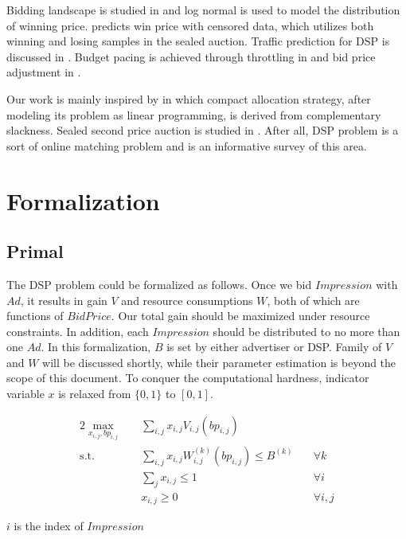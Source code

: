 \documentclass[sigconf]{acmart}
\newcommand{\sumj}{\sum\limits_j}
\newcommand{\sumij}{\sum\limits_{i,j}}
\newcommand{\sx}{x_{i,j}}
\newcommand{\sbp}{bp_{i,j}}
\newcommand{\sV}{V_{i,j}}
\newcommand{\sW}{W_{i,j}^{(k)}}
\newcommand{\sB}{B^{(k)}}
\newcommand{\dspresourceconstraint}{\sumij \sx \sW(\sbp) \le \sB}
\newcommand{\assignmentconstraint}{\sumj \sx \le 1}
\begin{document}
Bidding landscape is studied in \cite{YingCui2011} and log normal is used to model the distribution of winning price.
\cite{Wu2015} predicts win price with censored data, which utilizes both winning and losing samples in the sealed auction.
Traffic prediction for DSP is discussed in \cite{Traffic2016}.
Budget pacing is achieved through throttling in \cite{Throttle2015} and bid price adjustment in \cite{Pacing2013}.

Our work is mainly inspired by \cite{YeChen2011} in which compact allocation strategy,
    after modeling its problem as linear programming, is derived from complementary slackness.
Sealed second price auction is studied in \cite{SSPA1961}.
After all, DSP problem is a sort of online matching problem and \cite{Mehta} is an informative survey of this area.

\section{Formalization}

\subsection{Primal}

The DSP problem could be formalized as follows.
Once we bid $Impression$ with $Ad$, it results in gain $V$ and resource consumptions $W$, both of which are functions of $BidPrice$.
Our total gain should be maximized under resource constraints.
In addition, each $Impression$ should be distributed to no more than one $Ad$.
In this formalization, $B$ is set by either advertiser or DSP.
Family of $V$ and $W$ will be discussed shortly, while their parameter estimation is beyond the scope of this document.
To conquer the computational hardness, indicator variable $x$ is relaxed from $\{0, 1\}$ to $[0, 1]$.

\begin{alignat}{2}
    \max\limits_{\sx, \sbp} \quad & \sumij \sx \sV(\sbp) \quad    & {} \\
    \mbox{s.t.} \quad             & \dspresourceconstraint \quad  & \forall k \\
    \quad                         & \assignmentconstraint \quad   & \forall i \\
    \quad                         & \sx \ge 0 \quad               & \forall i,j
\end{alignat}

$i$ is the index of $Impression$
\end{document}
